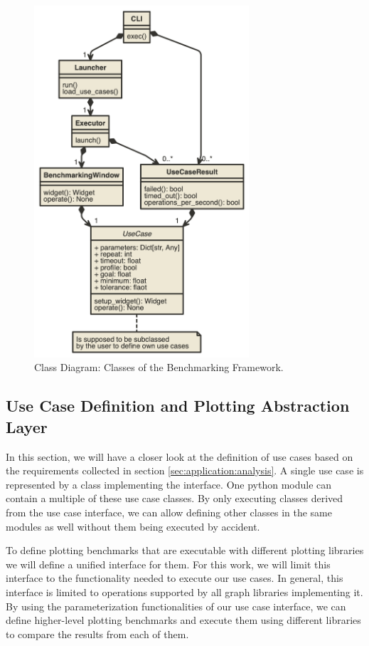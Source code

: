 \begin{figure}[h]
    \centering
    \includegraphics[width=8cm]{resources/img/class/widgetmark}
    \caption{
        Class Diagram: Classes of the Benchmarking Framework. 
    }
    \label{fig:application:design:classdiagram:widgetmark}
\end{figure}

\clearpage

\subsection{Use Case Definition and Plotting Abstraction Layer}

\label{sec:application:design:usecases}

In this section, we will have a closer look at the definition of use cases based on
the requirements collected in section \ref{sec:application:analysis}. A
single use case is represented by a class implementing the
 interface. One python module can contain a multiple
of these use case classes. By only executing classes derived from the use case
interface, we can allow defining other classes in the same modules as well
without them being executed by accident.

To define plotting benchmarks that are executable with different plotting
libraries we will define a unified interface for them. For this
work, we will limit this interface to the functionality needed to execute our
use cases. In general, this interface is limited to operations supported by all
graph libraries implementing it. By using the parameterization functionalities
of our use case interface, we can define higher-level plotting benchmarks and
execute them using different libraries to compare the results from each of them.

